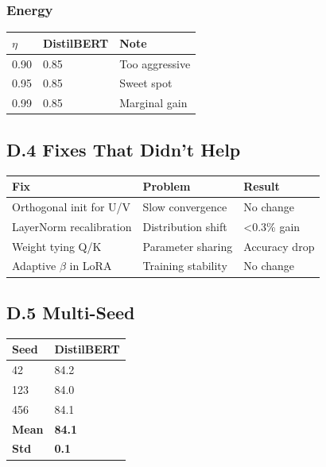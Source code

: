 \subsubsection{Energy}

\begin{table}[H]
\centering
\small
\begin{tabular}{lll}
\toprule
\textbf{$\eta$} & \textbf{DistilBERT} & \textbf{Note} \\
\midrule
0.90 & 0.85 & Too aggressive \\
0.95 & 0.85 & Sweet spot \\
0.99 & 0.85 & Marginal gain \\
\bottomrule
\end{tabular}
\end{table}

\subsection{D.4 Fixes That Didn't Help}

\begin{table}[H]
\centering
\small
\begin{tabular}{lll}
\toprule
\textbf{Fix} & \textbf{Problem} & \textbf{Result} \\
\midrule
Orthogonal init for U/V & Slow convergence & No change \\
LayerNorm recalibration & Distribution shift & <0.3\% gain \\
Weight tying Q/K & Parameter sharing & Accuracy drop \\
Adaptive $\beta$ in LoRA & Training stability & No change \\
\bottomrule
\end{tabular}
\end{table}

\subsection{D.5 Multi-Seed}

\begin{table}[H]
\centering
\small
\begin{tabular}{ll}
\toprule
\textbf{Seed} & \textbf{DistilBERT} \\
\midrule
42 & 84.2 \\
123 & 84.0 \\
456 & 84.1 \\
\textbf{Mean} & \textbf{84.1} \\
\textbf{Std} & \textbf{0.1} \\
\bottomrule
\end{tabular}
\end{table}


